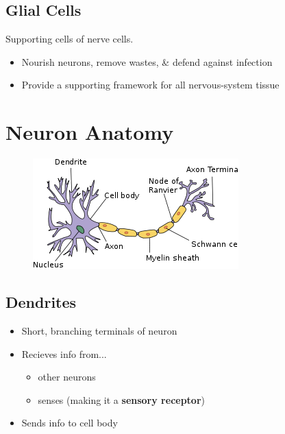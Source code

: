 \documentclass[a4paper,12pt]{article}
\begin{document}
\subsection{Glial Cells}
Supporting cells of nerve cells.
\begin{itemize}
    \item{Nourish neurons, remove wastes, \& defend against infection}
    \item{Provide a supporting framework for all nervous-system tissue}
\end{itemize}

\pagebreak

\section{Neuron Anatomy}

\begin{figure}[H]
    \centering
    \includegraphics[width=\textwidth]{neuron}
\end{figure}

\subsection{Dendrites}
\begin{itemize}
    \item{Short, branching terminals of neuron}
    \item{
            Recieves info from...
            \begin{itemize}
                \item{other neurons}
                \item{senses (making it a \textbf{sensory receptor})}
            \end{itemize}
        }
    \item{Sends info to cell body}
\end{itemize}
\end{document}

